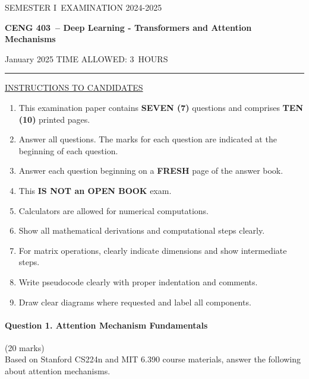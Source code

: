 \documentclass[12pt]{article}
\newcommand{\masunitnumber}{CENG 403}
\newcommand{\examdate}{January 2025}
\newcommand{\academicyear}{2024-2025}
\newcommand{\semester}{I}
\newcommand{\coursename}{Deep Learning - Transformers and Attention Mechanisms}
\newcommand{\numberofhours}{3}
\begin{document}
\setlength{\headsep}{5truemm}
\setlength{\headheight}{14.5truemm}
\setlength{\voffset}{-0.45truein}
\renewcommand{\headrulewidth}{0.0pt}
\begin{center}
SEMESTER \semester\ EXAMINATION \academicyear
\end{center}
\begin{center}
{\bf \masunitnumber\ -- \coursename}
\end{center}
\vspace{20truemm}
\noindent \examdate\hspace{45truemm} TIME ALLOWED: \numberofhours\ HOURS
\vspace{19truemm}
\hrule
\vspace{19truemm}
\noindent\underline{INSTRUCTIONS TO CANDIDATES}
\vspace{8truemm}
\begin{enumerate}
\item This examination paper contains {\bf SEVEN (7)} questions and comprises 
{\bf TEN (10)} printed pages.
\item Answer all questions. 
The marks for each question are indicated at the beginning of each question.
\item Answer each question beginning on a {\bf FRESH} page of the answer book.
\item This {\bf IS NOT an OPEN BOOK} exam.
\item Calculators are allowed for numerical computations.
\item Show all mathematical derivations and computational steps clearly.
\item For matrix operations, clearly indicate dimensions and show intermediate steps.
\item Write pseudocode clearly with proper indentation and comments.
\item Draw clear diagrams where requested and label all components.
\end{enumerate}
\newpage
\lhead{}
\rhead{\masunitnumber}
\chead{}
\lfoot{}
\cfoot{\thepage}
\rfoot{}
\setlength{\footskip}{45pt}

\paragraph{Question 1. Attention Mechanism Fundamentals}\hfill (20 marks)\\
Based on Stanford CS224n and MIT 6.390 course materials, answer the following about attention mechanisms.
\end{document}
